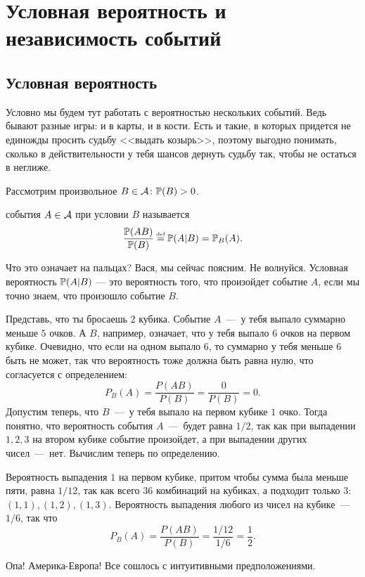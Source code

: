 \documentclass[../TV&MS.tex]{subfiles}
\begin{document}
\section{Условная вероятность и независимость событий}

\subsection{Условная вероятность}

\qquad Условно мы будем тут работать с вероятностью нескольких событий.
Ведь бывают разные игры: и в карты, и в кости. Есть и такие, в которых
придется не единожды просить судьбу <<выдать козырь>>, поэтому выгодно
понимать, сколько в действительности у тебя шансов дернуть судьбу так, 
чтобы не остаться в неглиже.

Рассмотрим произвольное $B \in \mathcal{A} \colon \mathbb{P}(B) > 0$.
\begin{Def}
 события $A \in \mathcal{A}$ при условии $B$ называется 
$$\frac{\Pro(AB)}{\Pro(B)} \myeq \Pro(A|B) = \Pro_B(A).$$
\end{Def}

Что это означает на пальцах? Вася, мы сейчас поясним. Не волнуйся. Условная вероятность 
$\mathbb{P}(A|B)$ --- это вероятность того, что произойдет событие $A$, если мы точно знаем, 
что произошло событие $B$.

\begin{Ex}
	Представь, что ты бросаешь $2$ кубика. Событие $A$~---~у тебя выпало суммарно меньше
	$5$ очков. А $B$, например, означает, что у тебя выпало $6$ очков на первом кубике.
	Очевидно, что если на одном выпало $6$, то суммарно у тебя меньше $6$ быть не может,
	так что вероятность тоже должна быть равна нулю, что согласуется с определением:
	$$P_B(A)= \frac{P(AB)}{P(B)}= \frac{0}{P(B)}=0.$$
	Допустим теперь, что $B$~---~у тебя выпало на первом кубике $1$ очко. Тогда понятно, что
	вероятность события $A$~---~будет равна $1/2$, так как при выпадении $1,2,3$ на втором кубике
	событие произойдет, а при выпадении других чисел~---~нет. Вычислим теперь по определению.
	
	Вероятность выпадения $1$ на первом кубике, притом чтобы сумма была меньше пяти, равна
	$1/12$, так как всего $36$ комбинаций на кубиках, а подходит только $3$: $(1,1), (1,2), (1,3)$.
	Вероятность выпадения любого из чисел на кубике~---~$1/6$, так что
	$$P_B(A)= \frac{P(AB)}{P(B)}= \frac{1/12}{1/6}=\frac12.$$
	
	\noindent
	Опа! Америка-Европа! Все сошлось с интуитивными предположениями.	
\end{Ex}
\end{document}
